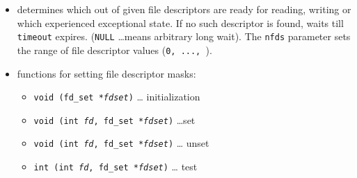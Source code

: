 \begin{slide}
\setlength{\baselineskip}{0.9\baselineskip}
\begin{itemize}
\item determines which out of given file descriptors are ready for reading,
writing or which experienced exceptional state. If no such descriptor is
found, waits till \texttt{timeout} expires.
(\texttt{NULL} \dots means arbitrary long wait). The \texttt{nfds} parameter
sets the range of file descriptor values (\texttt{0,~...,~}).
\item functions for setting file descriptor masks:
    \begin{itemize}
    \item \texttt{void (fd\_set *\emph{fdset})} \dots{}
    initialization
    \item \texttt{void (int \emph{fd}, fd\_set *\emph{fdset})}
    \dots set
    \item \texttt{void (int \emph{fd}, fd\_set *\emph{fdset})}
    \dots{} unset
    \item \texttt{int (int \emph{fd}, fd\_set *\emph{fdset})}
    \dots{} test
    \end{itemize}
\end{itemize}
\end{slide}

\label{SELECT}

